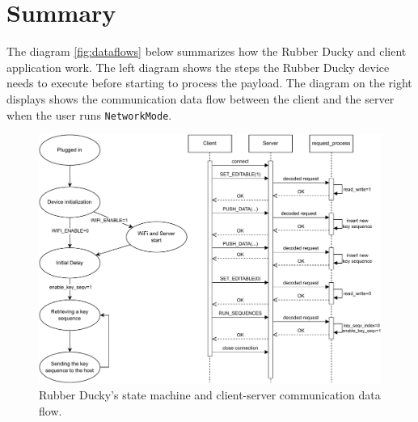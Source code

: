 \section{Summary}
The diagram \autoref{fig:dataflows} below summarizes how the Rubber Ducky and client application work. The left diagram shows the steps the Rubber Ducky device needs to execute before starting to process the payload. The diagram on the right displays shows the communication data flow between the client and the server when the user runs \verb|NetworkMode|.
\begin{figure}[ht]
    \centering
    \includegraphics[width=0.85\linewidth]{obrazky-figures/summary_diagram.pdf}
    \caption{Rubber Ducky's state machine and client-server communication data flow.}
    \label{fig:dataflows}
\end{figure}


